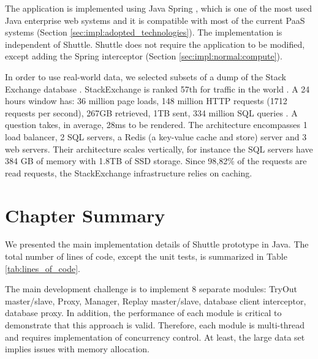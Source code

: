 The application is implemented using Java Spring \cite{spring}, which is one of the most used Java enterprise web systems and it is compatible with most of the current \ac{PaaS} systems (Section \ref{sec:impl:adopted_technologies}). The implementation is independent of Shuttle. Shuttle does not require the application to be modified, except adding the Spring interceptor (Section \ref{sec:impl:normal:compute}). 


In order to use real-world data, we selected subsets of a dump of the Stack Exchange database \cite{stackexchange_data}. StackExchange is ranked 57th for traffic in the world \cite{websiteRanking}. A 24 hours window has: 36 million page loads, 148 million \ac{HTTP} requests (1712 requests per second), 267GB retrieved, 1TB sent, 334 million \ac{SQL} queries \cite{stackStatistics}. A question takes, in average, 28ms to be rendered. The architecture encompasses 1 load balancer, 2 \ac{SQL} servers, a Redis \cite{redis} (a key-value cache and store) server and 3 web servers. Their architecture scales vertically, for instance the \ac{SQL} servers have 384 GB of memory with 1.8TB of SSD storage. Since 98,82\% of the requests are read requests, the StackExchange infrastructure relies on caching.

\section{Chapter Summary}\label{sec:impl:summary}
We presented the main implementation details of Shuttle prototype in Java. The total number of lines of code, except the unit tests, is summarized in Table \ref{tab:lines_of_code}.

The main development challenge is to implement 8 separate modules: TryOut master/slave, Proxy, Manager, Replay master/slave, database client interceptor, database proxy. In addition, the performance of each module is critical to demonstrate that this approach is valid. Therefore, each module is multi-thread and requires implementation of concurrency control. At least, the large data set implies issues with memory allocation.

